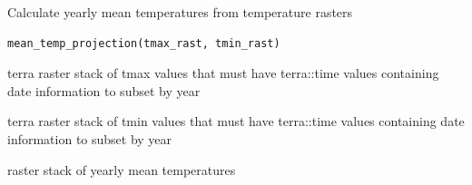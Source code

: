 %
\begin{Description}
Calculate yearly mean temperatures from temperature rasters
\end{Description}
%
\begin{Usage}
\begin{verbatim}
mean_temp_projection(tmax_rast, tmin_rast)
\end{verbatim}
\end{Usage}
%
\begin{Arguments}
\begin{ldescription}
\item[\code{tmax\_rast}] terra raster stack of tmax values that must have terra::time
values containing date information to subset by year

\item[\code{tmin\_rast}] terra raster stack of tmin values that must have terra::time
values containing date information to subset by year
\end{ldescription}
\end{Arguments}
%
\begin{Value}
raster stack of yearly mean temperatures
\end{Value}
